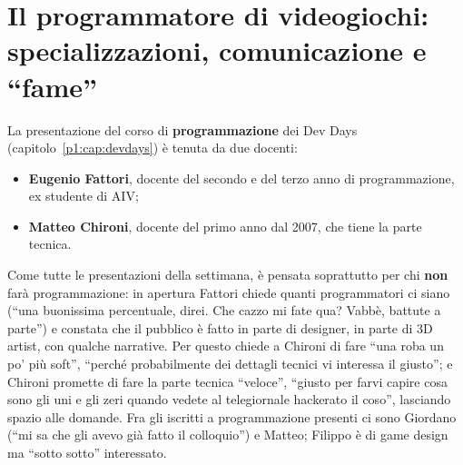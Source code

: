 %

\chapter[Il programmatore di videogiochi]{Il programmatore di videogiochi:
specializzazioni, comunicazione e ``fame''}
\label{p5:cap:programming}

La presentazione del corso di \textbf{programmazione} dei Dev Days
(capitolo~\ref{p1:cap:devdays}) è tenuta da due docenti:
\begin{itemize}
  \item \textbf{Eugenio Fattori}, docente del secondo e del terzo anno di
        programmazione, ex studente di AIV;
  \item \textbf{Matteo Chironi}, docente del primo anno dal 2007, che tiene la
        parte tecnica.
\end{itemize}
Come tutte le presentazioni della settimana, è pensata soprattutto per chi
\textbf{non} farà programmazione: in apertura Fattori chiede quanti
programmatori ci siano (``una buonissima percentuale, direi. Che cazzo mi fate
qua? Vabbè, battute a parte'') e constata che il pubblico è fatto in parte di
designer, in parte di 3D artist, con qualche narrative. Per questo chiede a
Chironi di fare ``una roba un po' più soft'', ``perché probabilmente dei
dettagli tecnici vi interessa il giusto''; e Chironi promette di fare la
parte tecnica ``veloce'', ``giusto per farvi capire cosa sono gli uni e gli
zeri quando vedete al telegiornale hackerato il coso'', lasciando spazio alle
domande. Fra gli iscritti a programmazione presenti ci sono Giordano (``mi sa
che gli avevo già fatto il colloquio'') e Matteo; Filippo è di game design ma
``sotto sotto'' interessato.

